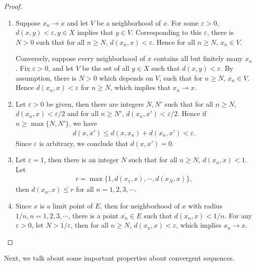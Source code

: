\documentclass[10pt]{book}
\theoremstyle{definition}
\numberwithin{equation}{chapter}
\begin{document}
\begin{proof}
~\begin{enumerate}[label=(\alph*)]
    \item Suppose $x_n \to x$ and let $V$ be a neighborhood of $x$. For some $\varepsilon > 0$, $d(x,y) < \varepsilon, y \in X$ implies that $y \in V$. Corresponding to this $\varepsilon$, there is $N > 0$ such that for all $n \geq N$, $d(x_n,x) < \varepsilon$. Hence for all $n \geq N$, $x_n \in V$.
    
    Conversely, suppose every neighborhood of $x$ contains all but finitely many $x_n$. Fix $\varepsilon > 0$, and let $V$ be the set of all $y \in X$ such that $d(x,y) < \varepsilon$. By assumption, there is $N > 0$ which depends on $V$, such that for $n \geq N$, $x_n \in V$. Hence $d(x_n, x) < \varepsilon$ for $n \geq N$, which implies that $x_n \to x$.
    
    \item Let $\varepsilon > 0$ be given, then there are integers $N, N'$ such that for all $n \geq N$, $d(x_n,x) < \varepsilon/2$ and for all $n \geq N'$, $d(x_n,x') < \varepsilon/2$. Hence if $n \geq \max \{N, N'\}$, we have
    \begin{align*}
        d(x,x') \leq d(x,x_n) + d(x_n,x') < \varepsilon.
    \end{align*}
    Since $\varepsilon$ is arbitrary, we conclude that $d(x,x') = 0$.
    
    \item Let $\varepsilon = 1$, then there is an integer $N$ such that for all $n \geq N$, $d(x_n, x) < 1$. Let \begin{align*}
        r = \max\{1, d(x_1,x), \cdots, d(x_N,x)\},
    \end{align*}
    then $d(x_n,x) \leq r$ for all $n = 1,2,3,\cdots$.
    
    \item Since $x$ is a limit point of $E$, then for neighborhood of $x$ with radius $1/n, n = 1,2,3,\cdots$, there is a point $x_n \in E$ such that $d(x_n,x) < 1/n$. For any $\varepsilon > 0$, let $N > 1/\varepsilon$, then for all $n \geq N$, $d(x_n, x) < \varepsilon$, which implies $x_n \to x$.
\end{enumerate}
\end{proof}

\medskip

Next, we talk about some important properties about convergent sequences.

\medskip
\end{document}

